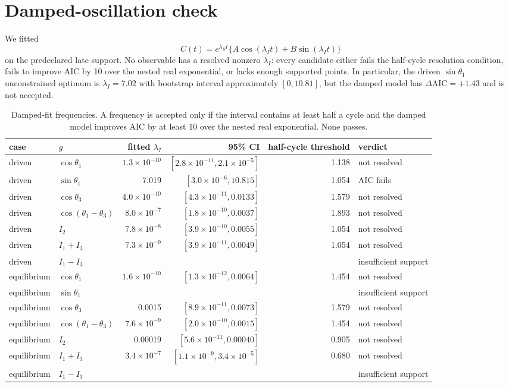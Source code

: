 \documentclass[11pt]{article}
\newcommand{\NA}{\textemdash}
\begin{document}
\section*{Damped-oscillation check}
We fitted
\[
C(t)=e^{\lambda_Rt}\{A\cos(\lambda_It)+B\sin(\lambda_It)\}
\]
on the predeclared late support.  No observable has a resolved nonzero
$\lambda_I$: every candidate either fails the half-cycle resolution condition,
fails to improve AIC by 10 over the nested real exponential, or lacks enough
supported points.  In particular, the driven $\sin\theta_1$ unconstrained
optimum is $\lambda_I=7.02$ with bootstrap interval approximately
$[0,10.81]$, but the damped model has $\Delta\mathrm{AIC}=+1.43$ and is not
accepted.

\begin{table}[h]
\centering\scriptsize
\begin{tabular}{llrrrl}
\toprule
case & $g$ & fitted $\lambda_I$ & 95\% CI & half-cycle threshold & verdict\\
\midrule
driven & $\cos\theta_1$ & $1.3\!\times\!10^{-10}$ & $[2.8\!\times\!10^{-11},2.1\!\times\!10^{-5}]$ & 1.138 & not resolved\\
driven & $\sin\theta_1$ & 7.019 & $[3.0\!\times\!10^{-6},10.815]$ & 1.054 & AIC fails\\
driven & $\cos\theta_3$ & $4.0\!\times\!10^{-10}$ & $[4.3\!\times\!10^{-11},0.0133]$ & 1.579 & not resolved\\
driven & $\cos(\theta_1-\theta_3)$ & $8.0\!\times\!10^{-7}$ & $[1.8\!\times\!10^{-10},0.0037]$ & 1.893 & not resolved\\
driven & $I_2$ & $7.8\!\times\!10^{-8}$ & $[3.9\!\times\!10^{-10},0.0055]$ & 1.054 & not resolved\\
driven & $I_1+I_3$ & $7.3\!\times\!10^{-9}$ & $[3.9\!\times\!10^{-11},0.0049]$ & 1.054 & not resolved\\
driven & $I_1-I_3$ & \NA & \NA & \NA & insufficient support\\
\midrule
equilibrium & $\cos\theta_1$ & $1.6\!\times\!10^{-10}$ & $[1.3\!\times\!10^{-12},0.0064]$ & 1.454 & not resolved\\
equilibrium & $\sin\theta_1$ & \NA & \NA & \NA & insufficient support\\
equilibrium & $\cos\theta_3$ & 0.0015 & $[8.9\!\times\!10^{-11},0.0073]$ & 1.579 & not resolved\\
equilibrium & $\cos(\theta_1-\theta_3)$ & $7.6\!\times\!10^{-9}$ & $[2.0\!\times\!10^{-10},0.0015]$ & 1.454 & not resolved\\
equilibrium & $I_2$ & 0.00019 & $[5.6\!\times\!10^{-11},0.00040]$ & 0.905 & not resolved\\
equilibrium & $I_1+I_3$ & $3.4\!\times\!10^{-7}$ & $[1.1\!\times\!10^{-9},3.4\!\times\!10^{-5}]$ & 0.680 & not resolved\\
equilibrium & $I_1-I_3$ & \NA & \NA & \NA & insufficient support\\
\bottomrule
\end{tabular}
\caption{Damped-fit frequencies.  A frequency is accepted only if the interval
contains at least half a cycle and the damped model improves AIC by at least
10 over the nested real exponential. None passes.}
\end{table}
\end{document}
